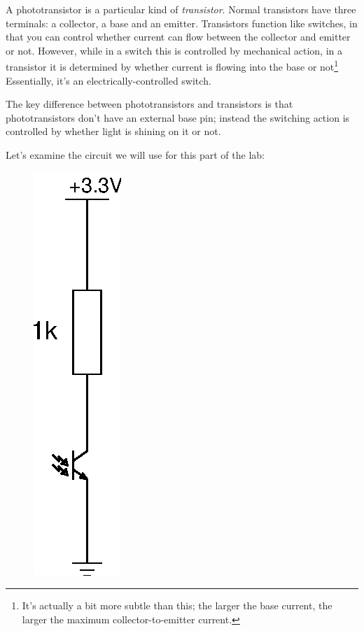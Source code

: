 \documentclass{article}
\begin{document}
A phototransistor is a particular kind of \emph{transistor}. Normal transistors
have three terminals: a collector, a base and an emitter. Transistors function
like switches, in that you can control whether current can flow between the
collector and emitter or not. However, while in a switch this is controlled by
mechanical action, in a transistor it is determined by whether current is
flowing into the base or not\footnote{It's actually a bit more subtle than this;
the larger the base current, the larger the maximum collector-to-emitter
current.} Essentially, it's an electrically-controlled switch.

The key difference between phototransistors and transistors is that
phototransistors don't have an external base pin; instead the switching action
is controlled by whether light is shining on it or not.

Let's examine the circuit we will use for this part of the lab:

\begin{figure}[h]
\centering
\includegraphics[scale=.7]{assets/fig/schem/ir-pt}
\label{fig:schem:ir-pt}
\end{figure}
\end{document}
